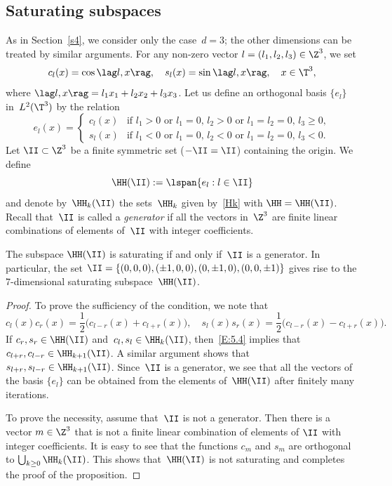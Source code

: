 \subsection{Saturating subspaces}
\label{S:5.2}
As in Section~\ref{s4}, we consider only the case~$d=3$; the other dimensions can be treated by similar arguments. For any non-zero vector $l=(l_1,l_2,l_3)\in \Z^3$, we set\vspace*{-3pt}
\[
c_l(x) = \cos\lag l,x\rag, \quad
s_l(x) = \sin\lag l,x\rag, \quad x\in\T^3,
\]
where $\lag l,x\rag = l_1x_1+l_2x_2+l_3x_3$. Let us define an orthogonal basis $\{e_l\}$ in~$L^2(\T^3)$ by the relation\vspace*{-3pt}
\[
e_l(x)=
\begin{cases} c_l(x) & \text{if }l_1 > 0\text{ or } l_1=0,\, l_2 > 0 \text{ or } l_1=l_2=0,\, l_3 \ge 0, \\ s_l(x) & \text{if }l_1 < 0\text{ or } l_1=0,\, l_2 < 0\text{ or } l_1=l_2=0,\, l_3 < 0.
\end{cases}
\]
Let $\II\subset\Z^3$ be a finite symmetric set (\ie $-\II=\II$) containing the origin. We define\vspace*{-3pt}%
\begin{equation}\label{E:5.3}
\HH(\II):=\lspan\{e_l:l\in\II\}
\end{equation}
and denote by~$\HH_k(\II)$ the sets~$\HH_k$ given by~\eqref{Hk} with $\HH=\HH(\II)$. Recall that~$\II$ is called a \emph{generator} if all the vectors in~$\Z^3$ are finite linear combinations of elements of~$\II$ with integer coefficients.

\begin{proposition}\label{P:5.2}
The subspace $\HH(\II)$ is saturating if and only if~$\II$ is a generator. In particular, the set $\II=\{(0,0,0), (\pm1,0,0),(0,\pm1,0),(0,0,\pm1)\}$ gives rise to the $7$-dimensional saturating subspace~$\HH(\II)$.
\end{proposition}

\begin{proof}
To prove the sufficiency of the condition, we note that\vspace*{-3pt}
\begin{equation}\label{E:5.4}
c_l(x)c_r(x)=\frac12\bigl(c_{l-r}(x)+c_{l+r}(x)\bigr), \quad
s_l(x)s_r(x)=\frac12\bigl(c_{l-r}(x)-c_{l+r}(x)\bigr).
\end{equation}
If $c_r, s_r\in\HH(\II)$ and~$c_l, s_l\in \HH_k(\II)$, then~\eqref{E:5.4} implies that $c_{l+r}, c_{l-r}\in \HH_{k+1}(\II)$. A similar argument shows that~$s_{l+r},s_{l-r}\in \HH_{k+1}(\II)$. Since~$\II$ is a generator, we see that all the vectors of the basis $\{e_l\}$ can be obtained from the elements of~$\HH(\II)$ after finitely many iterations.

To prove the necessity, assume that~$\II$ is not a generator. Then there is a vector $m\in\nobreak \Z^3$ that is not a finite linear combination of elements of $\II$ with integer coefficients. It is easy to see that the functions $c_m$ and $s_m$ are orthogonal to $\bigcup_{k\ge0} \HH_k(\II)$. This shows that~$\HH(\II)$ is not saturating and completes the proof of the proposition.
\end{proof}


